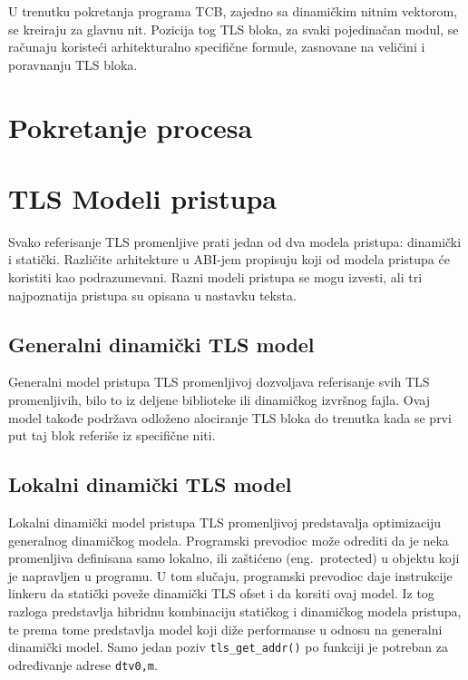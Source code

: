 \documentclass[12pt,oneside]{memoir}
\begin{document}
U trenutku pokretanja programa TCB, zajedno sa dinamičkim nitnim vektorom, se kreiraju za glavnu nit. Pozicija tog TLS bloka, za svaki pojedinačan modul, se računaju koristeći arhitekturalno specifične formule, zasnovane na veličini i poravnanju TLS bloka.

\section{Pokretanje procesa}



\section{TLS Modeli pristupa}

Svako referisanje TLS promenljive prati jedan od dva modela pristupa: dinamički i statički. Različite arhitekture u ABI-jem propisuju koji od modela pristupa će koristiti kao podrazumevani. Razni modeli pristupa se mogu izvesti, ali tri najpoznatija pristupa su opisana u nastavku teksta.

\subsection{Generalni dinamički TLS model}

Generalni model pristupa TLS promenljivoj dozvoljava referisanje svih TLS promenljivih, bilo to iz deljene biblioteke ili dinamičkog izvršnog fajla. Ovaj model takođe podržava odloženo alociranje TLS bloka do trenutka kada se prvi put taj blok referiše iz specifične niti.

\subsection{Lokalni dinamički TLS model}

Lokalni dinamički model pristupa TLS promenljivoj predstavalja optimizaciju generalnog dinamičkog modela. Programski prevodioc može odrediti da je neka promenljiva definisana samo lokalno, ili zaštićeno (eng.~protected) u objektu koji je napravljen u programu. U tom slučaju, programski prevodioc daje instrukcije linkeru da statički poveže dinamički TLS ofset i da korsiti ovaj model. Iz tog razloga predstavlja hibridnu kombinaciju statičkog i dinamičkog modela pristupa, te prema tome predstavlja model koji diže performanse u odnosu na generalni dinamički model. Samo jedan poziv \texttt{tls\_get\_addr()} po funkciji je potreban za određivanje adrese \texttt{dtv0,m}.
\end{document}

